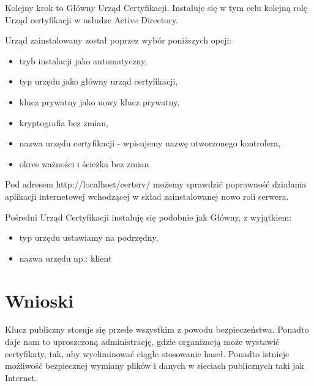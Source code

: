 \documentclass[a4paper,twoside,12pt]{mgr}
\begin{document}
Kolejny krok to Główny Urząd Certyfikacji. Instaluje się w tym celu kolejną rolę Urząd certyfikacji w usłudze Active Directory.

Urząd zainstalowany został poprzez wybór poniższych opcji:
\begin{itemize}
\item  tryb instalacji jako automatyczny,
\item  typ urzędu jako główny urząd certyfikacji,
\item  klucz prywatny jako nowy klucz prywatny,
\item  kryptografia bez zmian,
\item  nazwa urzędu certyfikacji - wpisujemy nazwę utworzonego kontrolera,
\item  okres ważności i ścieżka bez zmian
\end{itemize}

Pod adresem http://localhost/certsrv/ możemy sprawdzić poprawność działania aplikacji internetowej wchodzącej w skład zainstalowanej nowo roli serwera.

Pośredni Urząd Certyfikacji instaluję się podobnie jak Główny, z wyjątkiem:
\begin{itemize}
\item typ urzędu ustawiamy na podrzędny,
\item nazwa urzędu np.: klient
\end{itemize}

\chapter{Wnioski}
Klucz publiczny stosuje się przede wszystkim z powodu bezpieczeństwa. Ponadto daje nam to uproszczoną administrację, gdzie organizacją może wystawić certyfikaty, tak, aby wyeliminować ciągłe stosowanie haseł. Ponadto istnieje możliwość bezpiecznej wymiany plików i danych w sieciach publicznych taki jak Internet.
\end{document}

